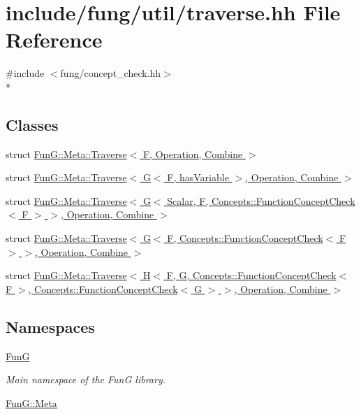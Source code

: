 \hypertarget{traverse_8hh}{}\section{include/fung/util/traverse.hh File Reference}
\label{traverse_8hh}
{\ttfamily \#include $<$fung/concept\+\_\+check.\+hh$>$}\\*
\subsection*{Classes}
\begin{DoxyCompactItemize}
\item 
struct \hyperlink{structFunG_1_1Meta_1_1Traverse}{Fun\+G\+::\+Meta\+::\+Traverse$<$ F, Operation, Combine $>$}
\item 
struct \hyperlink{structFunG_1_1Meta_1_1Traverse_3_01G_3_01F_00_01hasVariable_01_4_00_01Operation_00_01Combine_01_4}{Fun\+G\+::\+Meta\+::\+Traverse$<$ G$<$ F, has\+Variable $>$, Operation, Combine $>$}
\item 
struct \hyperlink{structFunG_1_1Meta_1_1Traverse_3_01G_3_01Scalar_00_01F_00_01Concepts_1_1FunctionConceptCheck_3_056d96032cb56cdcfc81b282c6fc44c83}{Fun\+G\+::\+Meta\+::\+Traverse$<$ G$<$ Scalar, F, Concepts\+::\+Function\+Concept\+Check$<$ F $>$ $>$, Operation, Combine $>$}
\item 
struct \hyperlink{structFunG_1_1Meta_1_1Traverse_3_01G_3_01F_00_01Concepts_1_1FunctionConceptCheck_3_01F_01_4_01_473eb79b17eeedd14b27190d68eb8ea5c}{Fun\+G\+::\+Meta\+::\+Traverse$<$ G$<$ F, Concepts\+::\+Function\+Concept\+Check$<$ F $>$ $>$, Operation, Combine $>$}
\item 
struct \hyperlink{structFunG_1_1Meta_1_1Traverse_3_01H_3_01F_00_01G_00_01Concepts_1_1FunctionConceptCheck_3_01F_013370ce68fd07becd92320937a020c699}{Fun\+G\+::\+Meta\+::\+Traverse$<$ H$<$ F, G, Concepts\+::\+Function\+Concept\+Check$<$ F $>$, Concepts\+::\+Function\+Concept\+Check$<$ G $>$ $>$, Operation, Combine $>$}
\end{DoxyCompactItemize}
\subsection*{Namespaces}
\begin{DoxyCompactItemize}
\item 
 \hyperlink{namespaceFunG}{FunG}
\begin{DoxyCompactList}\small\item\em Main namespace of the FunG library. \end{DoxyCompactList}\item 
 \hyperlink{namespaceFunG_1_1Meta}{Fun\+G\+::\+Meta}
\end{DoxyCompactItemize}
